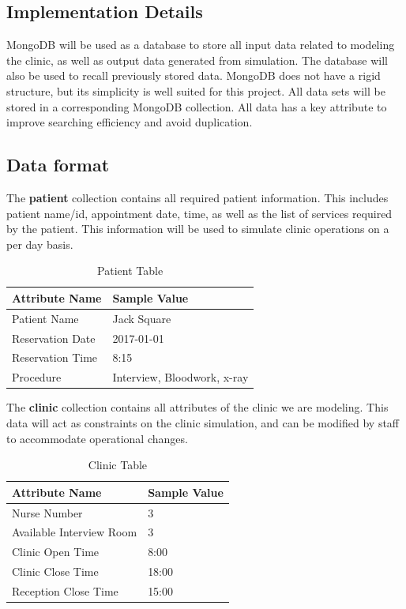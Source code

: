 \documentclass[12pt]{article}
\begin{document}
\subsection{Implementation Details}
MongoDB will be used as a database to store all input data related to modeling the clinic, as well as output data generated from simulation. The database will also be used to recall previously stored data. MongoDB does not have a rigid structure, but its simplicity is well suited for this project. All data sets will be stored in a corresponding MongoDB collection. All data has a key attribute to improve searching efficiency and avoid duplication.

\subsection{Data format}
The \textbf{patient} collection contains all required patient information. This includes patient name/id, appointment date, time, as well as the list of services required by the patient. This information will be used to simulate clinic operations on a per day basis.
\begin{table}[H]
\centering
\caption{Patient Table}
\label{patient-table}
\begin{tabular}{|l|l|}
\hline
Attribute Name   & Sample Value                \\ \hline
Patient Name     & Jack Square                 \\ \hline
Reservation Date & 2017-01-01                  \\ \hline
Reservation Time & 8:15                        \\ \hline
Procedure        & Interview, Bloodwork, x-ray \\ \hline
\end{tabular}
\end{table}
\hfill

The \textbf{clinic} collection contains all attributes of the clinic we are modeling. This data will act as constraints on the clinic simulation, and can be modified by staff to accommodate operational changes.
\begin{table}[H]
\centering
\caption{Clinic Table}
\label{clinic-table}
\begin{tabular}{|l|l|}
\hline
Attribute Name           & Sample Value \\ \hline
Nurse Number             & 3            \\ \hline
Available Interview Room & 3            \\ \hline
Clinic Open Time         & 8:00         \\ \hline
Clinic Close Time        & 18:00        \\ \hline
Reception Close Time     & 15:00        \\ \hline
\end{tabular}
\end{table}
\end{document}
